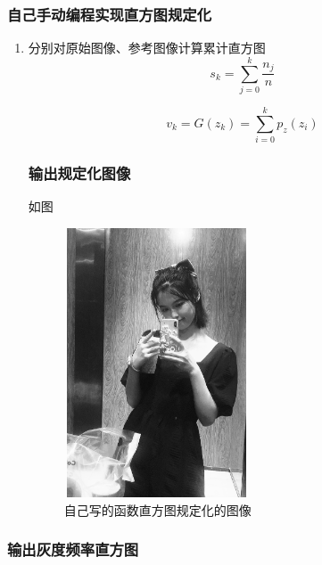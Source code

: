 \documentclass{article}
\begin{document}
  \subsubsection{自己手动编程实现直方图规定化}
  \begin{enumerate}
    \item 分别对原始图像、参考图像计算累计直方图
    $$s_{k}=\sum_{j=0}^{k} \frac{n_{j}}{n}$$

    $$v_{k}=G(z_{k})=\sum_{i=0}^{k} p_{z}(z_i)$$

    \subsubsection{输出规定化图像}
    如图
     \begin{figure}[h!]
                \centering
                \includegraphics[width=5.5cm,height=8cm]{xuan15.png}
                \caption{自己写的函数直方图规定化的图像}
                \end{figure}
  \end{enumerate}
   \subsubsection{输出灰度频率直方图}
\end{document}
